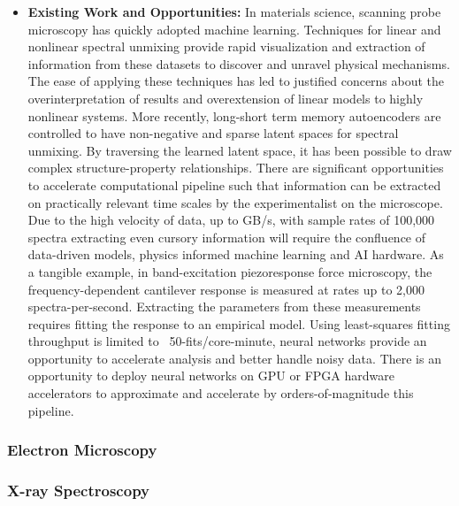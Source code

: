 \begin{itemize}
    \item \textbf{Existing Work and Opportunities:} In materials science, scanning probe microscopy has quickly adopted machine learning. Techniques for linear and nonlinear spectral unmixing provide rapid visualization and extraction of information from these datasets to discover and unravel physical mechanisms\cite{Ziatdinov2020-nt,Collins2020-na,Kalinin2021-gp,Collins2020-ml}. The ease of applying these techniques has led to justified concerns about the overinterpretation of results and overextension of linear models\cite{Griffin2020-mc} to highly nonlinear systems. More recently, long-short term memory autoencoders are controlled to have non-negative and sparse latent spaces for spectral unmixing. By traversing the learned latent space, it has been possible to draw complex structure-property relationships\cite{Agar2019-eq,Holstad2020-kq}. There are significant opportunities to accelerate computational pipeline such that information can be extracted on practically relevant time scales by the experimentalist on the microscope. Due to the high velocity of data, up to GB/s, with sample rates of 100,000 spectra extracting even cursory information will require the confluence of data-driven models, physics informed machine learning and AI hardware. As a tangible example, in band-excitation piezoresponse force microscopy, the frequency-dependent cantilever response is measured at rates up to 2,000 spectra-per-second. Extracting the parameters from these measurements requires fitting the response to an empirical model. Using least-squares fitting throughput is limited to ~50-fits/core-minute, neural networks provide an opportunity to accelerate analysis and better handle noisy data\cite{Borodinov2019-pn}. There is an opportunity to deploy neural networks on GPU or FPGA hardware accelerators to approximate and accelerate by orders-of-magnitude this pipeline.
    
\end{itemize}
  
 

\subsubsection{Electron Microscopy}
\subsubsection{X-ray Spectroscopy}
